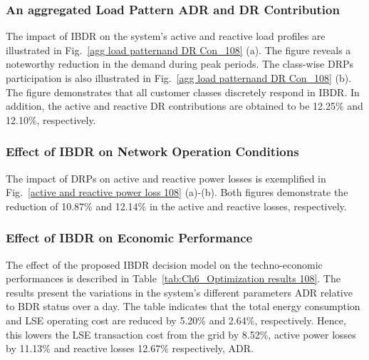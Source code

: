 \documentclass[journal]{IEEEtran}
\begin{document}
\subsubsection{An aggregated Load Pattern ADR and DR Contribution}
The impact of IBDR on the system's active and reactive load profiles are illustrated in Fig.~\mbox{\ref{agg load patternand DR Con_108}} (a). The figure reveals a noteworthy reduction in the demand during peak periods. The class-wise DRPs participation is also illustrated in Fig.~\mbox{\ref{agg load patternand DR Con_108}} (b). The figure demonstrates that all customer classes discretely respond in IBDR. In addition, the active and reactive DR contributions are obtained to be 12.25\% and 12.10\%, respectively.
\subsubsection{Effect of IBDR on Network Operation Conditions}
The impact of DRPs on active and reactive power losses is exemplified in Fig.~\mbox{\ref{active and reactive power loss 108}} (a)-(b). Both figures demonstrate the reduction of 10.87\% and 12.14\% in the active and reactive losses, respectively.
\subsubsection{Effect of IBDR on Economic Performance}
The effect of the proposed IBDR decision model on the techno-economic performances is described in Table~\mbox{\ref{tab:Ch6_Optimization results 108}}. The results present the variations in the system's different parameters ADR relative to BDR status over a day. The table indicates that the total energy consumption and LSE operating cost are reduced by 5.20\% and 2.64\%, respectively. Hence, this lowers the LSE transaction cost from the grid by 8.52\%, active power losses by 11.13\% and reactive losses 12.67\% respectively, ADR.
\end{document}
